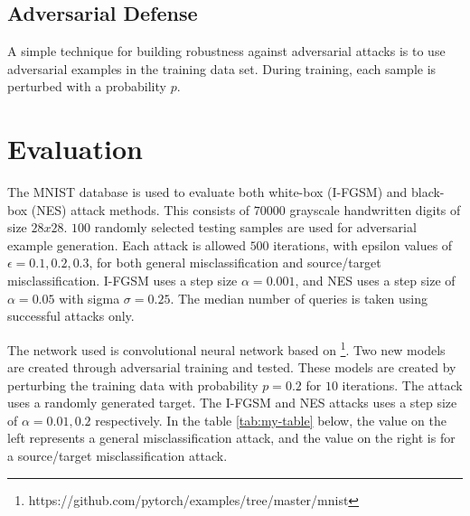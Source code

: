 \documentclass[12pt]{article}
\begin{document}
\subsection{Adversarial Defense}
A simple technique for building robustness against adversarial attacks is to use adversarial examples in the training data set.
During training, each sample is perturbed with a probability $p$.

\section{Evaluation}
The MNIST database \cite{lecun2010mnist} is used to evaluate both white-box (I-FGSM) and black-box (NES) attack methods.
This consists of $70000$ grayscale handwritten digits of size $28x28$.
$100$ randomly selected testing samples are used for adversarial example generation.
Each attack is allowed $500$ iterations, with epsilon values of $\epsilon = 0.1, 0.2, 0.3$, for both general misclassification and source/target misclassification.
I-FGSM uses a step size $\alpha = 0.001$, and NES uses a step size of $\alpha = 0.05$ with sigma $\sigma = 0.25$.
The median number of queries is taken using successful attacks only.

The network used is convolutional neural network based on \footnote{https://github.com/pytorch/examples/tree/master/mnist}.
Two new models are created through adversarial training and tested.
These models are created by perturbing the training data with probability $p = 0.2$ for $10$ iterations.
The attack uses a randomly generated target.
The I-FGSM and NES attacks uses a step size of $\alpha = 0.01, 0.2$ respectively.
In the table \ref{tab:my-table} below, the value on the left represents a general misclassification attack, and the value on the right is for a source/target misclassification attack.
\end{document}
